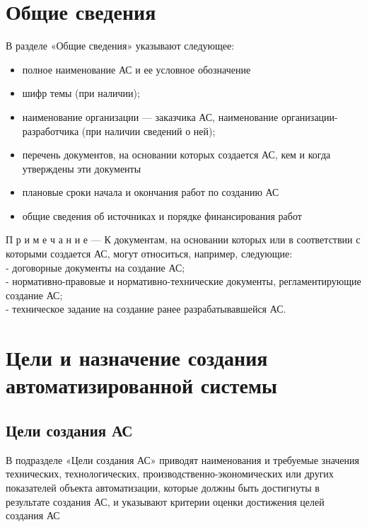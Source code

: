 {{{{\begin{flushright}
\begin{minipage}[t]{0.4\textwidth}
        \vspace{3mm}
        \makebox[6cm][r]{<<\rule{7mm}{0.4pt}>>\hrulefill~\the\year}
      \end{minipage}
    \end{flushright}
  }
}
\newpage
}
\section{Общие сведения}
В разделе «Общие сведения» указывают следующее:
\begin{itemize}
    \item полное наименование АС и ее условное обозначение
    \item шифр темы (при наличии);
    \item наименование организации — заказчика АС, наименование организации-разработчика (при наличии сведений о ней);
    \item перечень документов, на основании которых создается АС, кем и когда утверждены эти документы
    \item плановые сроки начала и окончания работ по созданию АС
    \item общие сведения об источниках и порядке финансирования работ
\end{itemize}

П р и м е ч а н и е — К документам, на основании которых или в соответствии с которыми создается АС, могут относиться, например, следующие:\\
- договорные документы на создание АС;\\
- нормативно-правовые и нормативно-технические документы, регламентирующие создание АС;\\
- техническое задание на создание ранее разрабатывавшейся АС.
\section{Цели и назначение создания автоматизированной системы}

\subsection{Цели создания АС}
В подразделе «Цели создания АС» приводят наименования и требуемые значения технических, технологических, производственно-экономических или других показателей объекта автоматизации, которые должны быть достигнуты в результате создания АС, и указывают критерии оценки достижения целей создания АС

}
